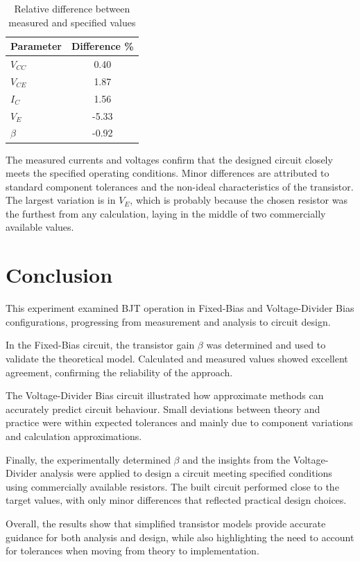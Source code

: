 \documentclass{article}
\begin{document}
\begin{table}[H]
    \centering
    \caption{Relative difference between measured and specified values}
    \begin{tabular}{l S[table-format=3.2]}
        \toprule
        Parameter & {Difference \%} \\
        \midrule
        \(V_{CC}\)  &  0.40 \\
        \(V_{CE}\)  &  1.87 \\
        \(I_C\)     &  1.56 \\
        \(V_E\)     & -5.33 \\
        \(\beta\)   & -0.92 \\
        \bottomrule
    \end{tabular}%
    \label{tab:4diff}%
\end{table}%

The measured currents and voltages confirm that the designed circuit closely meets the specified operating conditions.  
Minor differences are attributed to standard component tolerances and the non-ideal characteristics of the transistor.
The largest variation is in \(V_E\), which is probably because the chosen resistor was the furthest from any calculation, laying in the middle of two commercially available values.


\section{Conclusion}

This experiment examined BJT operation in Fixed-Bias and Voltage-Divider Bias configurations, progressing from measurement and analysis to circuit design.  

In the Fixed-Bias circuit, the transistor gain \(\beta\) was determined and used to validate the theoretical model.  
Calculated and measured values showed excellent agreement, confirming the reliability of the approach.  

The Voltage-Divider Bias circuit illustrated how approximate methods can accurately predict circuit behaviour.  
Small deviations between theory and practice were within expected tolerances and mainly due to component variations and calculation approximations.  

Finally, the experimentally determined \(\beta\) and the insights from the Voltage-Divider analysis were applied to design a circuit meeting specified conditions using commercially available resistors.  
The built circuit performed close to the target values, with only minor differences that reflected practical design choices.  

Overall, the results show that simplified transistor models provide accurate guidance for both analysis and design, while also highlighting the need to account for tolerances when moving from theory to implementation.  

\end{document}
